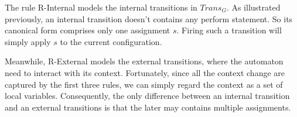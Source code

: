 The rule R-Internal models the internal transitions in $Trans_G$. As illustrated previously, an internal transition doesn't contains any perform statement. So its canonical form comprises only one assignment $s$. Firing such a transition will simply apply $s$ to the current configuration.

Meanwhile, R-External models the external transitions, where the automaton need to interact with its context. Fortunately, since all the context change are captured by the first three rules, we can simply regard the context as a set of local variables. Consequently, the only difference between an internal transition and an external transitions is that the later may contains multiple assignments.
